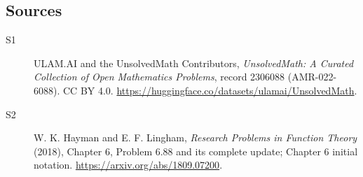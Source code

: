 \documentclass[11pt]{article}
\begin{document}
\subsection{Sources}
\begin{description}
\item[\hypertarget{source:2306088:1}{S1}] ULAM.AI and the UnsolvedMath Contributors, \emph{UnsolvedMath: A Curated Collection of Open Mathematics Problems}, record 2306088 (AMR-022-6088). CC BY 4.0. \url{https://huggingface.co/datasets/ulamai/UnsolvedMath}.
\item[\hypertarget{source:2306088:2}{S2}] W. K. Hayman and E. F. Lingham, \emph{Research Problems in Function Theory} (2018), Chapter 6, Problem 6.88 and its complete update; Chapter 6 initial notation. \url{https://arxiv.org/abs/1809.07200}.
\end{description}
\label{end:2306088}
\end{document}
